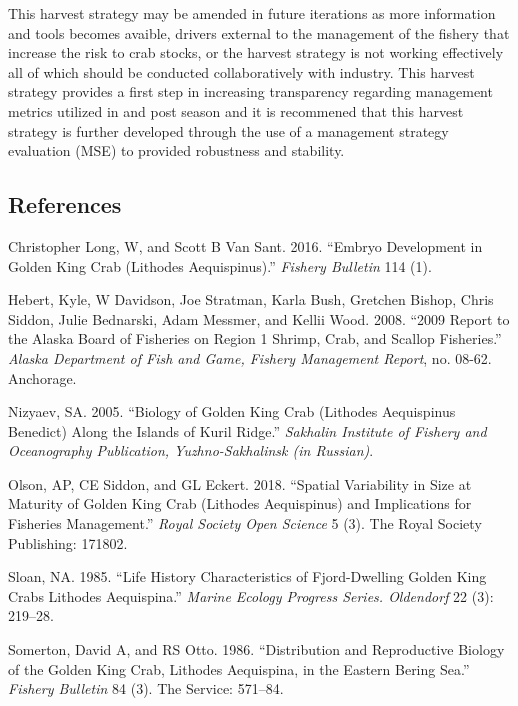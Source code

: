 \documentclass[]{article}
\begin{document}
This harvest strategy may be amended in future iterations as more
information and tools becomes avaible, drivers external to the
management of the fishery that increase the risk to crab stocks, or the
harvest strategy is not working effectively all of which should be
conducted collaboratively with industry. This harvest strategy provides
a first step in increasing transparency regarding management metrics
utilized in and post season and it is recommened that this harvest
strategy is further developed through the use of a management strategy
evaluation (MSE) to provided robustness and stability.

\subsection{References}\label{references}

\hypertarget{refs}{}
\hypertarget{ref-long2016}{}
Christopher Long, W, and Scott B Van Sant. 2016. ``Embryo Development in
Golden King Crab (Lithodes Aequispinus).'' \emph{Fishery Bulletin} 114
(1).

\hypertarget{ref-hebert2008}{}
Hebert, Kyle, W Davidson, Joe Stratman, Karla Bush, Gretchen Bishop,
Chris Siddon, Julie Bednarski, Adam Messmer, and Kellii Wood. 2008.
``2009 Report to the Alaska Board of Fisheries on Region 1 Shrimp, Crab,
and Scallop Fisheries.'' \emph{Alaska Department of Fish and Game,
Fishery Management Report}, no. 08-62. Anchorage.

\hypertarget{ref-nizyaev2005}{}
Nizyaev, SA. 2005. ``Biology of Golden King Crab (Lithodes Aequispinus
Benedict) Along the Islands of Kuril Ridge.'' \emph{Sakhalin Institute
of Fishery and Oceanography Publication, Yuzhno-Sakhalinsk (in
Russian)}.

\hypertarget{ref-olson2018spatial}{}
Olson, AP, CE Siddon, and GL Eckert. 2018. ``Spatial Variability in Size
at Maturity of Golden King Crab (Lithodes Aequispinus) and Implications
for Fisheries Management.'' \emph{Royal Society Open Science} 5 (3). The
Royal Society Publishing: 171802.

\hypertarget{ref-sloan1985}{}
Sloan, NA. 1985. ``Life History Characteristics of Fjord-Dwelling Golden
King Crabs Lithodes Aequispina.'' \emph{Marine Ecology Progress Series.
Oldendorf} 22 (3): 219--28.

\hypertarget{ref-somerton1986}{}
Somerton, David A, and RS Otto. 1986. ``Distribution and Reproductive
Biology of the Golden King Crab, Lithodes Aequispina, in the Eastern
Bering Sea.'' \emph{Fishery Bulletin} 84 (3). The Service: 571--84.
\end{document}
